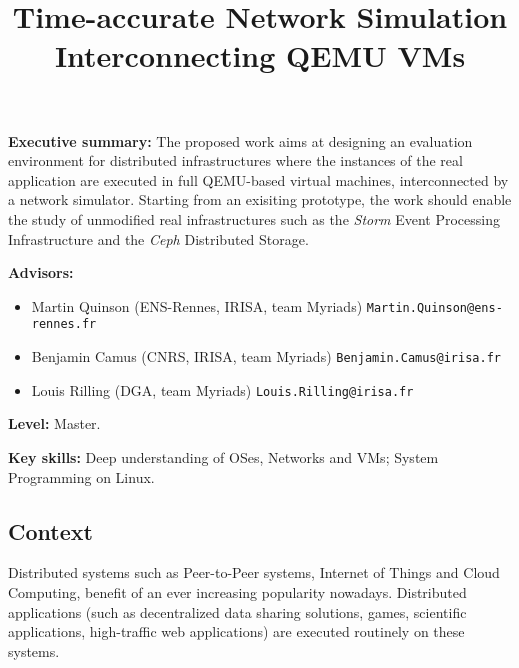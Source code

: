 \documentclass[a4paper,11pt]{article}
\begin{document}
\title{Time-accurate Network Simulation\\ Interconnecting QEMU VMs}

\author{}

\date{}
\maketitle

\vspace{-1.2cm}

\pagestyle{empty}
\thispagestyle{empty}

\noindent \textbf{Executive summary:} The proposed work aims at
designing an evaluation environment for distributed infrastructures
where the instances of the real application are executed in full
QEMU-based virtual machines, interconnected by a network simulator.
Starting from an exisiting prototype, the work should enable the study
of unmodified real infrastructures such as the \textit{Storm} Event
Processing Infrastructure and the \textit{Ceph} Distributed
Storage.

\noindent\textbf{Advisors:}\vspace{-.6\baselineskip}
\begin{itemize}
\item Martin Quinson (ENS-Rennes, IRISA, team Myriads)
  \texttt{Martin.Quinson@ens-rennes.fr}\vspace{-.5\baselineskip} 
\item Benjamin Camus (CNRS, IRISA, team Myriads)
  \texttt{Benjamin.Camus@irisa.fr}\vspace{-.5\baselineskip} 
\item Louis Rilling (DGA, team Myriads) \texttt{Louis.Rilling@irisa.fr} 
\end{itemize}\vspace{-.5\baselineskip}

\noindent \textbf{Level:} Master.

\noindent \textbf{Key skills:} Deep understanding of OSes, Networks
and VMs; System Programming on Linux.


\medskip
\subsection*{Context}

Distributed systems such as Peer-to-Peer systems, Internet of Things
and Cloud Computing, benefit of an ever increasing popularity
nowadays.  Distributed applications (such as decentralized data
sharing solutions, games, scientific applications, high-traffic web
applications) are executed routinely on these systems.
\end{document}
